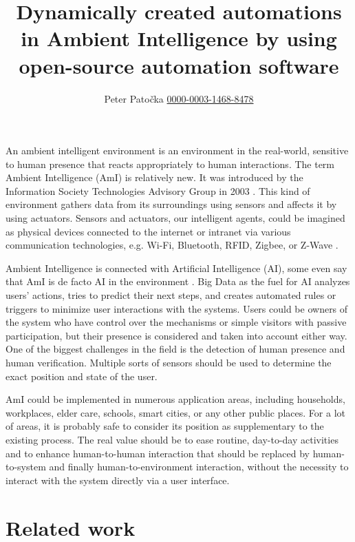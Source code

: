 \documentclass[fleqn,10pt]{olplainarticle}
\title{Dynamically created automations in Ambient Intelligence by using open-source automation software}
\author[1]{Peter Patočka {\tiny \href{ https://orcid.org/0000-0003-1468-8478}{\scshape 0000-0003-1468-8478}}}
\affil[1]{Department of Intelligent Systems, University of Technology, Brno, Czech Republic}
\begin{document}
\flushbottom
\maketitle
\thispagestyle{empty}

\vskip10pt

An ambient intelligent environment is an environment in the real-world, sensitive to human presence that reacts appropriately to human interactions. The term Ambient Intelligence (AmI) is relatively new. It was introduced by the Information Society Technologies Advisory Group in 2003 \cite{Istag2003}. This kind of environment gathers data from its surroundings using sensors and affects it by using actuators. Sensors and actuators, our intelligent agents, could be imagined as physical devices connected to the internet or intranet via various communication technologies, e.g. Wi-Fi, Bluetooth, RFID, Zigbee, or Z-Wave \cite{ElAzab2021}.

\vskip10pt

Ambient Intelligence is connected with Artificial Intelligence (AI), some even say that AmI is de facto AI in the environment \cite{Sukreep2020}. Big Data as the fuel for AI analyzes users’ actions, tries to predict their next steps, and creates automated rules or triggers to minimize user interactions with the systems. Users could be owners of the system who have control over the mechanisms or simple visitors with passive participation, but their presence is considered and taken into account either way. One of the biggest challenges in the field is the detection of human presence and human verification. Multiple sorts of sensors should be used to determine the exact position and state of the user.

\vskip10pt

AmI could be implemented in numerous application areas, including households, workplaces, elder care, schools, smart cities, or any other public places. For a lot of areas, it is probably safe to consider its position as supplementary to the existing process. The real value should be to ease routine, day-to-day activities and to enhance human-to-human interaction that should be replaced by human-to-system and finally human-to-environment interaction, without the necessity to interact with the system directly via a user interface.

\section{Related work}
\end{document}
